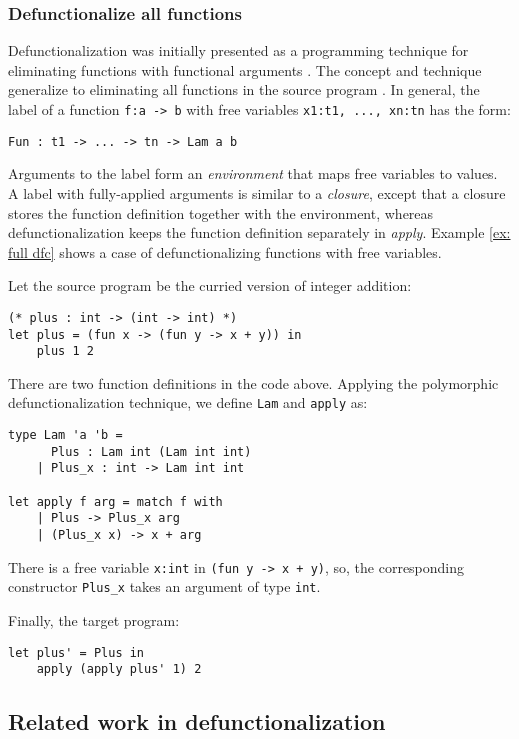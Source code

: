 \subsubsection{Defunctionalize all functions}
Defunctionalization was initially presented as a programming technique for eliminating functions with functional arguments \cite{reynolds1972definitional}. The concept and technique generalize to eliminating all functions in the source program \cite{chin1996higher}. In general, the label of a function \texttt{f:a -> b} with free variables \texttt{x1:t1, ..., xn:tn} has the form:
\begin{lstlisting}
Fun : t1 -> ... -> tn -> Lam a b
\end{lstlisting}
Arguments to the label form an \textit{environment} that maps free variables to values. A label with fully-applied arguments is similar to a \textit{closure}, except that a closure stores the function definition together with the environment, whereas defunctionalization keeps the function definition separately in \textit{apply}. Example \ref{ex: full dfc} shows a case of defunctionalizing functions with free variables.

\begin{exmp} Let the source program be the curried version of integer addition:

\begin{lstlisting}
(* plus : int -> (int -> int) *)
let plus = (fun x -> (fun y -> x + y)) in
    plus 1 2
\end{lstlisting}
There are two function definitions in the code above. Applying the polymorphic defunctionalization technique, we define \texttt{Lam} and \texttt{apply} as:
\begin{lstlisting}
type Lam 'a 'b = 
	  Plus : Lam int (Lam int int)
	| Plus_x : int -> Lam int int

let apply f arg = match f with
	| Plus -> Plus_x arg
	| (Plus_x x) -> x + arg
\end{lstlisting}

There is a free variable \texttt{x:int} in \texttt{(fun y -> x + y)}, so, the corresponding constructor \texttt{Plus\_x} takes an argument of type \texttt{int}.

Finally, the target program:
\begin{lstlisting}
let plus' = Plus in
	apply (apply plus' 1) 2
\end{lstlisting}
	\label{ex: full dfc}
\end{exmp}

\subsection{Related work in defunctionalization}

